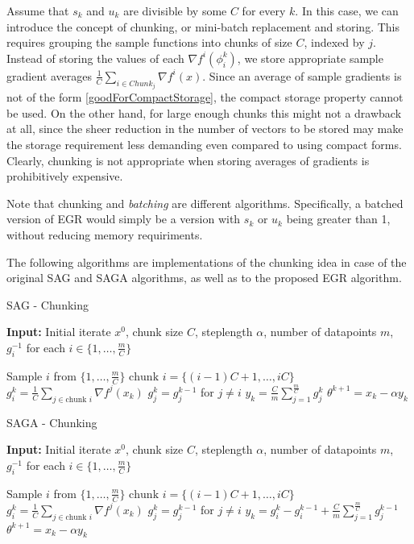 \documentclass[11pt]{article}
\begin{document}
	Assume that $s_k$ and $u_k$ are divisible by some $C$ for every $k$. In this case, we can introduce the concept of chunking, or mini-batch replacement and storing. This requires grouping the sample functions into chunks of size $C$, indexed by $j$. Instead of storing the values of each $ \nabla f^i(\phi_i^k)$, we store appropriate sample gradient averages $\frac{1}{C} \sum_{i \in Chunk_j}  \nabla f^i(x)$. Since an average of sample gradients is not of the form \eqref{goodForCompactStorage}, the compact storage property cannot be used. On the other hand, for large enough chunks this might not a drawback at all, since the sheer reduction in the number of vectors to be stored may make the storage requirement less demanding even compared to using compact forms. Clearly, chunking is not appropriate when storing averages of gradients is prohibitively expensive.  

	Note that chunking and \emph{batching} are different algorithms. Specifically, a batched version of EGR would simply be a version with $s_k$ or $u_k$ being greater than 1, without reducing memory requiriments. 
	 
	   The following algorithms are implementations of the chunking idea in case of the original SAG and SAGA algorithms, as well as to the proposed EGR algorithm.
	   
   \begin{algorithm}
   	[H] 
   	\caption{SAG - Chunking}
   	\label{alg:sag-chunking}
   	{\bf Input:} Initial iterate $x^0$, chunk size $C$, steplength $\alpha$, number of datapoints $m$, $g_i^{-1}$ for each $i \in \{ 1, \ldots,\frac{m}{C} \}$
   	\begin{algorithmic}
   		[1] 
   		\State Sample $i$ from $\{ 1, \ldots, \frac{m}{C} \}$
		\State $\mbox{chunk } i  = \{ (i-1)C+1,\ldots, iC \}$
   		\State $ g_i^k = \frac{1}{C} \sum_{j \in \mbox{chunk } i }  \nabla f^{j}(x_k) $ 
   		\State $ g_j^k = g_j^{k-1} $ for $j \neq i$ 
   		\State $y_k = \frac{C}{m} \sum_{j=1}^{\frac{m}{C}} g_j^k$ 
   		\State $\theta^{k+1} = x_k - \alpha y_k$ 
   		\EndLoop 
   	\end{algorithmic}
   \end{algorithm}

   \begin{algorithm}
   	[H] 
   	\caption{SAGA - Chunking}
   	\label{alg:saga-chunking}
   	{\bf Input:} Initial iterate $x^0$, chunk size $C$, steplength $\alpha$, number of datapoints $m$, $g_i^{-1}$ for each $i \in \{ 1, \ldots,\frac{m}{C} \}$
   	\begin{algorithmic}
   		[1] 
   		\State Sample $i$ from $\{ 1, \ldots, \frac{m}{C} \}$
		\State $\mbox{chunk } i  = \{ (i-1)C+1,\ldots, iC \}$
   		\State $ g_i^k = \frac{1}{C} \sum_{j \in \mbox{chunk } i }  \nabla f^{j}(x_k) $ 
   		\State $ g_j^k = g_j^{k-1} $ for $j \neq i$ 
   		\State $y_k =  g_i^{k} -  g_i^{k-1}  +\frac{C}{m} \sum_{j = 1}^{\frac{m}{C}}g_j^{k-1}$ 
   		\State $\theta^{k+1} = x_k - \alpha y_k$ 
   		\EndLoop 
   	\end{algorithmic}
   \end{algorithm}
   
\end{document}
